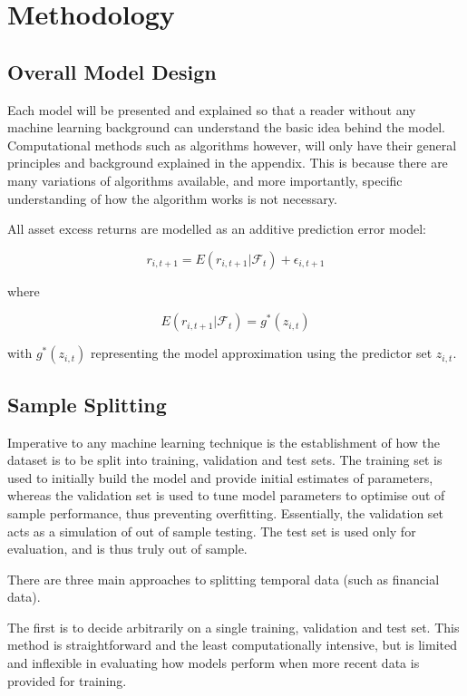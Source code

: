 \documentclass[man, a4paper, biblatex]{article}
\begin{document}
\section{Methodology}

\subsection{Overall Model Design}

Each model will be presented and explained so that a reader without any machine learning background can understand the basic idea behind the model. Computational methods such as algorithms however, will only have their general principles and background explained in the appendix. This is because there are many variations of algorithms available, and more importantly, specific understanding of how the algorithm works is not necessary. 

All asset excess returns are modelled as an additive prediction error model:

\begin{equation}
	r_{i, t+1} = E(r_{i, t+1} | \mathcal{F}_t) + \epsilon_{i, t+1}
\end{equation}

where 

\begin{equation}
	E(r_{i, t+1} | \mathcal{F}_t) = g^*(z_{i,t})
\end{equation}

with $g^*(z_{i,t})$ representing the model approximation using the predictor set $z_{i,t}$.

\subsection{Sample Splitting}

Imperative to any machine learning technique is the establishment of how the dataset is to be split into training, validation and test sets. The training set is used to initially build the model and provide initial estimates of parameters, whereas the validation set is used to tune model parameters to optimise out of sample performance, thus preventing overfitting. Essentially, the validation set acts as a simulation of out of sample testing. The test set is used only for evaluation, and is thus truly out of sample.

There are three main approaches to splitting temporal data (such as financial data). 

The first is to decide arbitrarily on a single training, validation and test set. This method is straightforward and the least computationally intensive, but is limited and inflexible in evaluating how models perform when more recent data is provided for training. 
\end{document}
